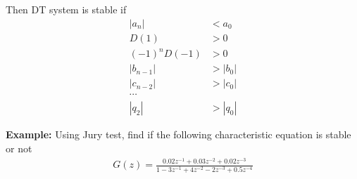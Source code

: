 \documentclass[twoside]{article}
\begin{document}
%
Then DT system is stable if
%
\begin{align*}
|a_n| &< a_0 
\\
D(1) &> 0
\\
(-1)^n D(-1) &> 0
\\
|b_{n-1}| &> |b_0|
\\
|c_{n-2}| &> |c_0|
\\
\cdots
\\
|q_{2}| &> |q_0|
\end{align*}
%

\textbf{Example:} Using Jury test, find if the following 
characteristic equation is stable or not
%
\begin{align*}
  G(z) = \frac{0.02 z^{-1} + 0.03 z^{-2} + 0.02 z^{-3}}{1 - 3 z^{-1} + 4 z^{-2} - 2 z^{-3} + 0.5 z^{-4}}
\end{align*}
%
\end{document}
